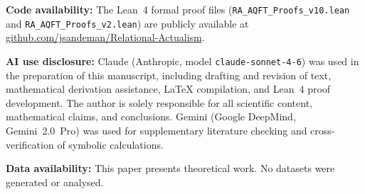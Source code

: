 \documentclass[11pt,a4paper]{article}
\theoremstyle{plain}
\theoremstyle{definition}
\theoremstyle{remark}
\begin{document}
\textbf{Code availability:} The Lean~4 formal proof files
(\texttt{RA\_AQFT\_Proofs\_v10.lean} and \texttt{RA\_AQFT\_Proofs\_v2.lean})
are publicly available at
\href{https://github.com/jsandeman/Relational-Actualism}{github.com/jsandeman/Relational-Actualism}.

\textbf{AI use disclosure:} Claude (Anthropic, model \texttt{claude-sonnet-4-6}) was used in the preparation of this manuscript, including drafting and revision of text, mathematical derivation assistance, \LaTeX{} compilation, and Lean~4 proof development. The author is solely responsible for all scientific content, mathematical claims, and conclusions. Gemini (Google DeepMind, Gemini~2.0~Pro) was used for supplementary literature checking and cross-verification of symbolic calculations.


\textbf{Data availability:} This paper presents theoretical work. No datasets
were generated or analysed.
\end{document}
